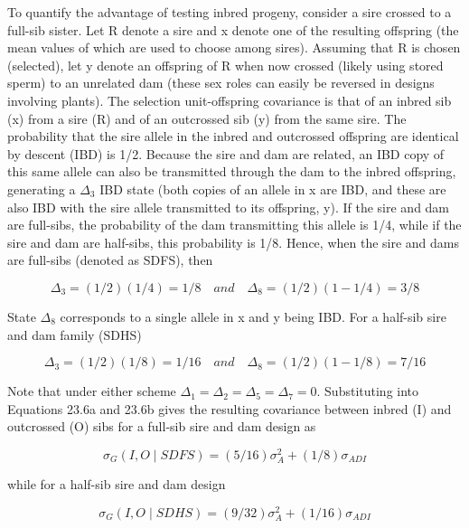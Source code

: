 \documentclass{article}
\begin{document}
To quantify the advantage of testing inbred progeny, consider a sire crossed to a full-sib sister. Let R denote a sire and x denote one of the resulting offspring (the mean values of which are used to choose among sires). Assuming that R is chosen (selected), let y denote an offspring of R when now crossed (likely using stored sperm) to an unrelated dam (these sex roles can easily be reversed in designs involving plants). The selection unit-offspring covariance is that of an inbred sib (x) from a sire (R) and of an outcrossed sib (y) from the same sire. The probability that the sire allele in the inbred and outcrossed offspring are identical by descent (IBD) is 1/2. Because the sire and dam are related, an IBD copy of this same allele can also be transmitted through the dam to the inbred offspring, generating a  $ \Delta_3 $ IBD state (both copies of an allele in x are IBD, and these are also IBD with the sire allele transmitted to its offspring, y). If the sire and dam are full-sibs, the probability of the dam transmitting this allele is 1/4, while if the sire and dam are half-sibs, this probability is 1/8. Hence, when the sire and dams are full-sibs (denoted as SDFS), then

\begin{equation}
\Delta_{3}=(1/2)(1/4)=1/8\quad and\quad\Delta_{8}=(1/2)(1-1/4)=3/8
\tag{23.11a}
\label{eq:23_11a}
\end{equation}

State  $ \Delta_{8} $ corresponds to a single allele in x and y being IBD. For a half-sib sire and dam family (SDHS)

\begin{equation}
\Delta_{3}=(1/2)(1/8)=1/16\quad and\quad\Delta_{8}=(1/2)(1-1/8)=7/16
\tag{23.11b}
\label{eq:23_11b}
\end{equation}

Note that under either scheme  $ \Delta_1 = \Delta_2 = \Delta_5 = \Delta_7 = 0 $. Substituting into Equations 23.6a and 23.6b gives the resulting covariance between inbred (I) and outcrossed (O) sibs for a full-sib sire and dam design as

\begin{equation}
\sigma_{G}(I,O\mid SDFS)=(5/16)\sigma_{A}^{2}+(1/8)\sigma_{ADI}
\tag{23.11c}
\label{eq:23_11c}
\end{equation}

while for a half-sib sire and dam design

\begin{equation}
\sigma_{G}(I,O\mid SDHS)=(9/32)\sigma_{A}^{2}+(1/16)\sigma_{ADI}
\tag{23.11d}
\label{eq:23_11d}
\end{equation}
\end{document}
